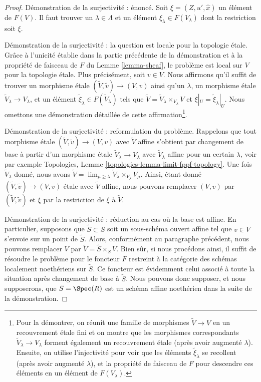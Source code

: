 \begin{proof}
\medskip\noindent
Démonstration de la surjectivité : énoncé.
Soit $\xi = (Z, u', \hat x)$ un élément de $F(V)$.
Il faut trouver un $\lambda \in \Lambda$ et un élément
$\xi_\lambda \in F(V_\lambda)$ dont la restriction soit $\xi$.

\medskip\noindent
Démonstration de la surjectivité : la question est locale pour la topologie \'etale.
Grâce à l'unicité établie dans la partie précédente de la démonstration et à la
propriété de faisceau de $F$ du Lemme \ref{lemma-sheaf}, le problème
est local sur $V$ pour la topologie \'etale. Plus précisément, soit $v \in V$.
Nous affirmons qu'il suffit de trouver un morphisme \'etale
$(\tilde V, \tilde v) \to (V, v)$ ainsi qu'un
$\lambda$, un morphisme \'etale $\tilde V_\lambda \to V_\lambda$,
et un élément $\tilde \xi_\lambda \in F(\tilde V_\lambda)$ tels que
$\tilde V = \tilde V_\lambda \times_{V_\lambda} V$
et $\xi|_U = \tilde \xi_\lambda|_U$. Nous omettons une démonstration détaillée de
cette affirmation\footnote{Pour la démontrer,
on réunit une famille de morphismes $\tilde V \to V$
en un recouvrement \'etale fini et on montre que les morphismes correspondants
$\tilde V_\lambda \to V_\lambda$ forment également un recouvrement \'etale (après
avoir augmenté $\lambda$). Ensuite, on utilise l'injectivité pour voir que
les éléments $\tilde \xi_\lambda$ se recollent (après avoir augmenté $\lambda$),
et la propriété de faisceau de $F$ pour descendre ces
éléments en un élément de $F(V_\lambda)$.}.

\medskip\noindent
Démonstration de la surjectivité : reformulation du problème.
Rappelons que tout morphisme \'etale $(\tilde V, \tilde v) \to (V, v)$
avec $\tilde V$ affine s'obtient par changement de base à partir d'un morphisme \'etale
$\tilde V_\lambda \to V_\lambda$ avec $\tilde V_\lambda$ affine
pour un certain $\lambda$, voir par exemple
Topologies, Lemme \ref{topologies-lemma-limit-fppf-topology}.
Une fois $\tilde V_\lambda$ donné, nous avons
$\tilde V = \lim_{\mu \geq \lambda} \tilde V_\lambda \times_{V_\lambda} V_\mu$.
Ainsi, étant donné $(\tilde V, \tilde v) \to (V, v)$ \'etale avec $\tilde V$ affine,
nous pouvons remplacer $(V, v)$ par $(\tilde V, \tilde v)$ et $\xi$ par
la restriction de $\xi$ à $\tilde V$.

\medskip\noindent
Démonstration de la surjectivité : réduction au cas où la base est affine. En particulier,
supposons que $\tilde S \subset S$ soit un sous-schéma ouvert affine tel
que $v \in V$ s'envoie sur un point de $\tilde S$. Alors, conformément
au paragraphe précédent, nous pouvons remplacer $V$ par $\tilde V = \tilde S \times_S V$.
Bien sûr, si nous procédons ainsi, il suffit de résoudre le problème
pour le foncteur $F$ restreint à la catégorie des schémas localement noethériens
sur $\tilde S$. Ce foncteur est évidemment celui
associé à toute la situation après changement de base à $\tilde S$.
Nous pouvons donc supposer, et nous supposerons, que $S = \Spec(R)$ est un schéma affine noethérien
dans la suite de la démonstration.


\end{proof}
